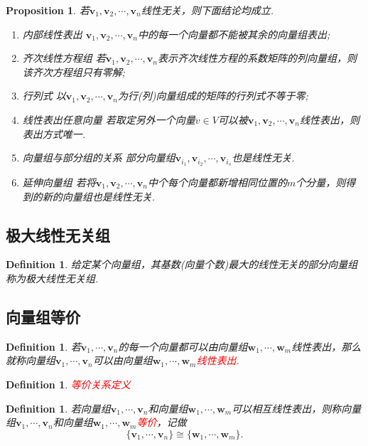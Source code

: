 \documentclass{article}
\newtheorem{proposition}[theorem]{Proposition}
\newtheorem{definition}[theorem]{Definition}
\newcommand{\mbf}[1]{\bm{#1}}
\newcommand{\redt}[1]{\textcolor{red}{#1}}
\begin{document}
\begin{proposition}
\rm 若$\mbf{v}_1,\mbf{v}_2,\cdots,\mbf{v}_n$线性无关，则下面结论均成立.
\begin{enumerate}
	\item {\color{red} 内部线性表出} $\mbf{v}_1,\mbf{v}_2,\cdots,\mbf{v}_n$中的每一个向量都不能被其余的向量组表出;
	\item {\color{red} 齐次线性方程组} 若$\mbf{v}_1,\mbf{v}_2,\cdots,\mbf{v}_n$表示齐次线性方程的系数矩阵的列向量组，则该齐次方程组只有零解;
	\item {\color{red} 行列式} 以$\mbf{v}_1,\mbf{v}_2,\cdots,\mbf{v}_n$为行(列)向量组成的矩阵的行列式不等于零;
	\item {\color{red} 线性表出任意向量} 若取定另外一个向量$v \in V$可以被$\mbf{v}_1,\mbf{v}_2,\cdots,\mbf{v}_n$线性表出，则表出方式唯一.
	\item {\color{red} 向量组与部分组的关系} 部分向量组$\mbf{v}_{i_1},\mbf{v}_{i_2},\cdots,\mbf{v}_{i_s}$也是线性无关. 
	\item {\color{red} 延伸向量组} 若将$\mbf{v}_1,\mbf{v}_2,\cdots,\mbf{v}_n$中个每个向量都新增相同位置的$m$个分量，则得到的新的向量组也是线性无关.
\end{enumerate}
\end{proposition}

\subsection{极大线性无关组}

\begin{definition}
\rm 给定某个向量组，其基数(向量个数)最大的线性无关的部分向量组称为极大线性无关组.
\end{definition}

\subsection{向量组等价}

\begin{definition}
\rm 若$\mbf{v}_1,\cdots,\mbf{v}_n$的每一个向量都可以由向量组$\mbf{w}_1,\cdots,\mbf{w}_m$线性表出，那么就称向量组$\mbf{v}_1,\cdots,\mbf{v}_n$可以由向量组$\mbf{w}_1,\cdots,\mbf{w}_m$\redt{线性表出}.
\end{definition}

\begin{definition}
\rm \redt{等价关系定义}
\end{definition}

\begin{definition}
\rm 若向量组$\mbf{v}_1,\cdots,\mbf{v}_n$和向量组$\mbf{w}_1,\cdots,\mbf{w}_m$可以相互线性表出，则称向量组$\mbf{v}_1,\cdots,\mbf{v}_n$和向量组$\mbf{w}_1,\cdots,\mbf{w}_m$\redt{等价}，记做
$$
\{\mbf{v}_1,\cdots,\mbf{v}_n\} \cong \{\mbf{w}_1,\cdots,\mbf{w	}_m\}.
$$
\end{definition}
\end{document}
